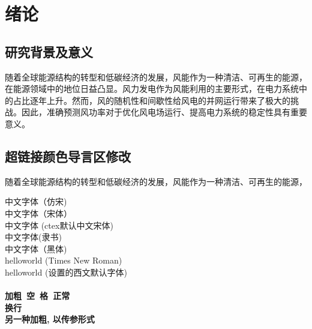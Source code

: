 \documentclass[a4paper, zihao=-4, twoside, fontset=fandol]{ctexart}
\begin{document}
{
    \newpage
    \thispagestyle{plain}  %
     
    {
        \renewcommand{\contentsname}{\heiti\zihao{3}\textbf{\\ 目\ 录}}
        \centering
        \tableofcontents  %
        \par %
    }
}


{
\newpage
\setcounter{page}{1}  %
\songti
{}

\section{绪论}
\subsection{研究背景及意义}
随着全球能源结构的转型和低碳经济的发展，风能作为一种清洁\cite{what_is_system-1}、可再生的能源，在能源领域中的地位日益凸显。风力发电作为风能利用的主要形式，在电力系统中的占比逐年上升。然而，风的随机性和间歇性给风电的并网运行带来了极大的挑战。因此，准确预测风功率对于优化风电场运行、提高电力系统的稳定性具有重要意义。

\subsection{超链接颜色导言区修改}
随着全球能源结构的转型和低碳经济的发展，风能作为一种\cite{cleaning_task}清洁、可再生的能源，

{ %
\begin{flushleft}
    \noindent  %
    {\fangsong 中文字体（仿宋)}  \\ 
    {\songti 中文字体（宋体）}     \\ 
    {中文字体 (ctex默认中文宋体)}    \\
    {\lishu 中文字体(隶书)}       \\ 
    {\heiti 中文字体（黑体)}         \\
    {\tnr helloworld (Times New Roman)}\\
    {\songti helloworld (设置的西文默认字体)}\\
    \leavevmode \\
    {\bfseries 加粗\ 空\ 格\ \mdseries 正常\\换行}  \\
    {\textbf{另一种加粗, 以传参形式}}
\end{flushleft}
}


}
\end{document}
